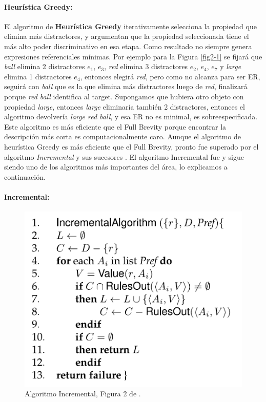 \paragraph{Heur\'istica Greedy:} El algoritmo de {\bf Heur\'istica Greedy} \cite{greedy} iterativamente selecciona la propiedad que elimina m\'as distractores, y argumentan que la propiedad seleccionada tiene el m\'as alto poder discriminativo en esa etapa. Como resultado 
no siempre genera expresiones referenciales m\'inimas. Por ejemplo para la Figura \ref{fig2-1} se fijar\'a que {\it ball} elimina 2 distractores {$e_{1}$, $e_{3}$}, 
{\it red} elimina 3 distractores {$e_{2}$, $e_{4}$, $e_{7}$} y {\it large} elimina 1 distractores {$e_{4}$}, entonces elegir\'a {\it red}, 
pero como no alcanza para ser ER, seguir\'a con {\it ball} que es la que elimina m\'as distractores luego de {\it red}, finalizar\'a porque 
{\it red ball} identifica al target. Supongamos que hubiera otro objeto con propiedad {\it large}, entonces {\it large} eliminar\'ia tambi\'en  
 2 distractores, entonces el algoritmo devolver\'ia {\it large red ball}, y esa ER no es minimal, es sobreespecificada.
Este algoritmo es m\'as eficiente que el Full Brevity porque encontrar la descripci\'on m\'as corta es computacionalmente caro. Aunque el 
algoritmo de heur\'istica Greedy es m\'as eficiente que el Full Brevity, pronto fue superado por el algoritmo {\it Incremental} 
y sus sucesores \cite{C92-1038,incremental}. El algoritmo Incremental fue y sigue siendo uno de los algoritmos 
m\'as importantes del \'area, lo explicamos a continuaci\'on. 

\paragraph{Incremental:}
\label{sec:algo_incremental}
\begin{figure}[ht]
\includegraphics[width=.5\textwidth]{images/algoritmoIncremental.png}
\caption{Algoritmo Incremental, Figura 2 de \protect\cite{survey}.}\label{algoritmoIncremental}

\end{figure}

